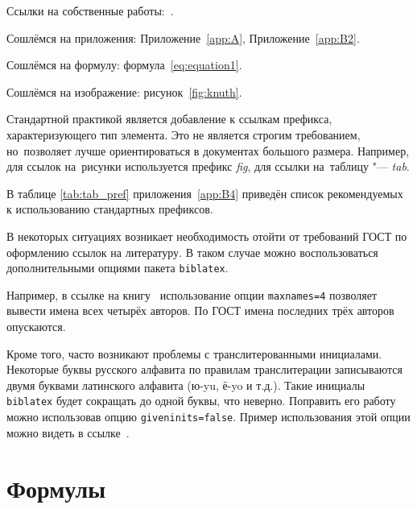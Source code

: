 %

Ссылки на собственные работы:~\cite{vakbib1, confbib1}.

Сошлёмся на приложения: Приложение~\cref{app:A}, Приложение~\cref{app:B2}.

Сошлёмся на формулу: формула~\cref{eq:equation1}.

Сошлёмся на изображение: рисунок~\cref{fig:knuth}.

Стандартной практикой является добавление к ссылкам префикса, характеризующего тип элемента.
Это не является строгим требованием, но~позволяет лучше ориентироваться в документах большого размера.
Например, для ссылок на~рисунки используется префикс \textit{fig},
для ссылки на~таблицу "--- \textit{tab}.

В таблице \cref{tab:tab_pref} приложения~\cref{app:B4} приведён список рекомендуемых
к использованию стандартных префиксов.

В некоторых ситуациях возникает необходимость отойти от требований ГОСТ по оформлению ссылок на
литературу.
В таком случае можно воспользоваться дополнительными опциями пакета \verb+biblatex+.

Например, в ссылке на книгу~\cite{sobenin_kdv} использование опции \verb+maxnames=4+ позволяет
вывести имена всех четырёх авторов.
По ГОСТ имена последних трёх авторов опускаются.

Кроме того, часто возникают проблемы с транслитерованными инициалами. Некоторые буквы русского
алфавита по правилам транслитерации записываются двумя буквами латинского алфавита (ю-yu, ё-yo и
т.д.).
Такие инициалы \verb+biblatex+ будет сокращать до одной буквы, что неверно.
Поправить его работу можно использовав опцию \verb+giveninits=false+.
Пример использования этой опции можно видеть в ссылке~\cite{initials}.

\section{Формулы}\label{sec:ch1/sec6}

